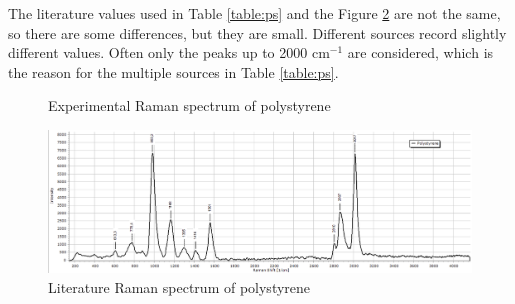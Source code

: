     \bigskip
    
    The literature values used in Table \ref{table:ps} and the Figure \ref{fig:ps_l} are not the same, so there are some differences, but they are small. Different sources record slightly different values. Often only the peaks up to 2000 cm\(^{-1} \) are considered, which is the reason for the multiple sources in Table \ref{table:ps}. 
    

    \newpage

    \begin{figure}[h]
        \centering
        \caption{Experimental Raman spectrum of polystyrene}
        \label{fig:ps_x}
        \vspace{-10pt}
    \end{figure}

    \begin{figure}[h]
        \centering
        \includegraphics[width=\textwidth]{images/lit_raman/PS.png}
        \caption{Literature Raman spectrum of polystyrene \cite{spectrap}}
        \label{fig:ps_l}
    \end{figure}
